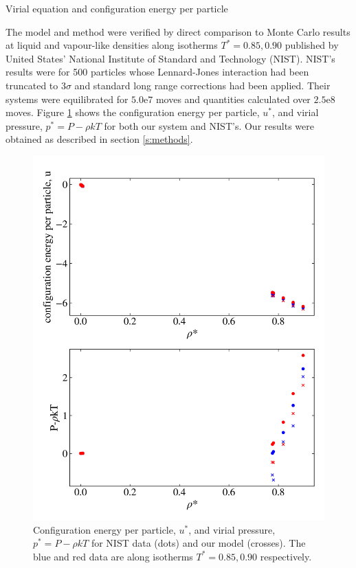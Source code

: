 \documentclass[10pt, twocolumn]{revtex4}    %
\begin{document}
Virial equation and configuration energy per particle


The model and method were verified by direct comparison to Monte Carlo results at liquid and vapour-like densities along isotherms $T^{*}=0.85, 0.90$ published by United States' National Institute of Standard and Technology (NIST). NIST's results were for 500 particles whose Lennard-Jones interaction had been truncated to $3\sigma{}$ and standard long range corrections had been applied. Their systems were equilibrated for $5.0\text{e}7$ moves and quantities calculated over $2.5\text{e}8$ moves. Figure \ref{fig:NIST_comparison} shows the configuration energy per particle, $u^*$, and virial pressure, $p^{*} = P - \rho{}kT$ for both our system and NIST's. Our results were obtained as described in section \ref{s:methods}.

\begin{figure}
	\includegraphics[width=\linewidth]{figures/NISTcomparison.png}
	\caption{Configuration energy per particle, $u^*$, and virial pressure, $p^{*} = P - \rho{}kT$ for NIST data (dots) and our model (crosses). The blue and red data are along isotherms $T^{*} = 0.85, 0.90$ respectively.}
	\label{fig:NIST_comparison}
\end{figure}
\end{document}
